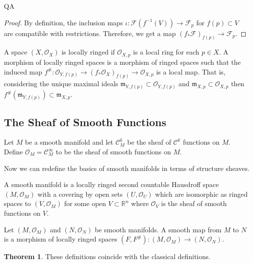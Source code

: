 QA	 \documentclass[12pt]{extarticle}
\newcommand{\R}{\mathbb{R}}
\theoremstyle{definition}
\newtheorem{theorem}{Theorem}[section]
\newenvironment{definition}[1][Definition:]{\begin{trivlist}
\item[\hskip \labelsep {\bfseries #1}]}{\end{trivlist}}
\newcommand{\C}[1]{\mathcal{C}^{#1}}
\newcommand{\F}{\mathcal{F}}
\renewcommand{\O}{\mathcal{O}}
\begin{document}
\begin{proof}
By definition, the inclusion maps $\iota : \F(f^{-1}(V)) \to \F_p$ for $f(p) \subset V$ are compatible with restrictions. Therefore, we get a map $(f_* \F)_{f(p)} \to \F_p$.  
\end{proof}

\begin{definition}
A space $(X, \O_X)$ is locally ringed if $\O_{X,p}$ is a local ring for each $p \in X$. A morphism of locally ringed spaces is a morphism of ringed spaces such that the induced map $f^{\#} : \O_{Y,f(p)} \to (f_* \O_X)_{f(p)} \to \O_{X, p}$ is a local map. That is, considering the unique maximal ideals $\mathfrak{m}_{Y, f(p)} \subset \O_{Y,f(p)}$ and  $\mathfrak{m}_{X, p} \subset \O_{X, p}$ then $f^{\#}(\mathfrak{m}_{Y, f(p)}) \subset \mathfrak{m}_{X, p}$.   
\end{definition}

\subsection{The Sheaf of Smooth Functions}

\begin{definition}
Let $M$ be a smooth manifold and let $\C{k}_M$ be the sheaf of $\C{k}$ functions on $M$. Define $\O_M = \C{\infty}_M$ to be the sheaf of smooth functions on $M$.
\end{definition}


Now we can redefine the basics of smooth manifolds in terms of structure sheaves.

\begin{definition}

\end{definition}

\begin{definition}
A smooth manifold is a locally ringed second countable Hausdroff space $(M, \O_M)$ with a covering by open sets $(U, \O_U)$ which are isomorphic as ringed spaces to $(V, \O_M)$ for some open $V \subset \R^n$ where $\O_V$ is the sheaf of smooth functions on $V$.  
\end{definition}

\begin{definition}
Let $(M, \O_M)$ and $(N, \O_N)$ be smooth manifolds. A smooth map from $M$ to $N$ is a morphism of locally ringed spaces $(F, F^{\#}) : (M, \O_M) \to (N, \O_N)$. 
\end{definition}

\begin{theorem}
These definitions coincide with the classical definitions. 
\end{theorem}
\end{document}
